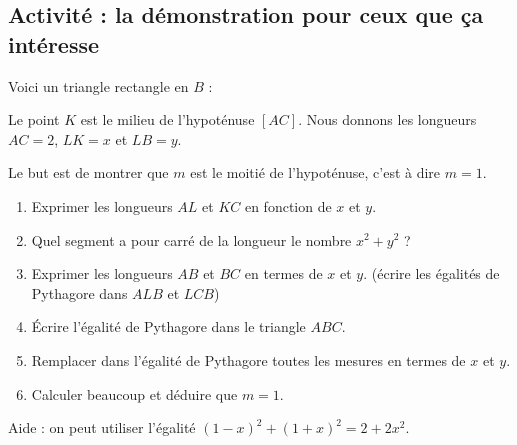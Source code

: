 
\subsection*{Activité : la démonstration pour ceux que ça intéresse}

Voici un triangle rectangle en \( B\) :

\begin{center}

\end{center}
Le point \( K\) est le milieu de l'hypoténuse \( [AC]\). Nous donnons les longueurs \( AC=2\), \( LK=x\) et \( LB=y\).

Le but est de montrer que \( m\) est le moitié de l'hypoténuse, c'est à dire \( m=1\).

\begin{enumerate}
    \item
        Exprimer les longueurs \( AL\) et \( KC\) en fonction de \( x\) et \( y\).
    \item
        Quel segment a pour carré de la longueur le nombre \( x^2+y^2\) ?
    \item
        Exprimer les longueurs \( AB\) et \( BC\) en termes de \( x\) et \( y\). (écrire les égalités de Pythagore dans \( ALB\) et \( LCB\))
    \item
        Écrire l'égalité de Pythagore dans le triangle \( ABC\).
    \item
        Remplacer dans l'égalité de Pythagore toutes les mesures en termes de \( x\) et \( y\).
    \item
        Calculer beaucoup et déduire que \( m=1\).
\end{enumerate}
Aide : on peut utiliser l'égalité \( (1-x)^2+(1+x)^2=2+2x^2\).

